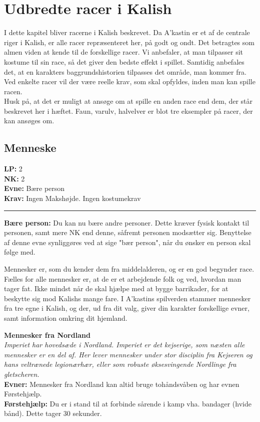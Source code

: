 \chapter{Udbredte racer i Kalish}
I dette kapitel bliver racerne i Kalish beskrevet. Da A’kastin er et af de centrale riger i Kalish, er alle racer repræsenteret her, på godt og ondt. Det betragtes som almen viden at kende til de forskellige racer. Vi anbefaler, at man tilpasser sit kostume til sin race, så det giver den bedste effekt i spillet. Samtidig anbefales det, at en karakters baggrundshistorien tilpasses det område, man kommer fra. Ved enkelte racer vil der være reelle krav, som skal opfyldes, inden man kan spille racen.\\
Husk på, at det er muligt at ansøge om at spille en anden race end dem, der står beskrevet her i hæftet. Faun, varulv, halvelver er blot tre eksempler på racer, der kan ansøges om.\\

\section{Menneske}
\begin{race*}[Mennesker]
\textbf{LP:} 2\\ 
\textbf{NK:} 2\\ 
\textbf{Evne:} Bære person\\
\textbf{Krav:} Ingen Makshøjde. Ingen kostumekrav\\
\rule{\textwidth}{0.4pt}
\textbf{Bære person:} Du kan nu bære andre personer. Dette kræver fysisk kontakt til personen, samt mere NK end denne, såfremt personen modsætter sig. Benyttelse af denne evne synliggøres ved at sige "bær person", når du ønsker en person skal følge med.\\
\end{race*}

Mennesker er, som du kender dem fra middelalderen, og er en god begynder race.\\
Fælles for alle mennesker er, at de er et arbejdende folk og ved, hvordan man tager fat. Ikke mindst når de skal hjælpe med at bygge barrikader, for at beskytte sig mod Kalishs mange fare. I A’kastins spilverden stammer mennesker fra tre egne i Kalish, og der, ud fra dit valg, giver din karakter forskellige evner, samt information omkring dit hjemland. 

\textbf{Mennesker fra Nordland}\\
\textit{Imperiet har hovedsæde i Nordland. Imperiet er det kejserige, som næsten alle mennesker er en del af. Her lever mennesker under stor disciplin fra Kejseren og hans veltrænede legionærhær, eller som robuste øksesvingende Nordlinge fra gletscheren.}\\
\textbf{Evner:} Mennesker fra Nordland kan altid bruge tohåndsvåben og har evnen Førstehjælp.\\
\textbf{Førstehjælp:} Du er i stand til at forbinde sårende i kamp vha. bandager (hvide bånd). Dette tager 30 sekunder.\\

